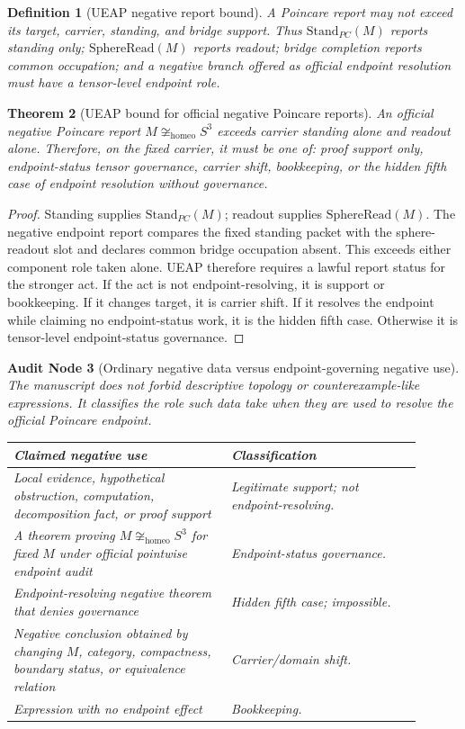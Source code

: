 \documentclass[11pt]{article}
\newtheorem{theorem}{Theorem}[section]
\newtheorem{definition}[theorem]{Definition}
\newtheorem{audit}[theorem]{Audit Node}
\newcommand{\Sthree}{S^{3}}
\newcommand{\StandPC}{\mathrm{Stand}_{PC}}
\newcommand{\SphereRead}{\mathrm{SphereRead}}
\newcommand{\Homeo}{\cong_{\mathrm{homeo}}}
\begin{document}
\begin{definition}[UEAP negative report bound]
A Poincare report may not exceed its target, carrier, standing, and bridge support. Thus \(\StandPC(M)\) reports standing only; \(\SphereRead(M)\) reports readout; bridge completion reports common occupation; and a negative branch offered as official endpoint resolution must have a tensor-level endpoint role.
\end{definition}

\begin{theorem}[UEAP bound for official negative Poincare reports]\label{thm:ueap-negative-bound}
An official negative Poincare report \(M\not\Homeo\Sthree\) exceeds carrier standing alone and readout alone. Therefore, on the fixed carrier, it must be one of: proof support only, endpoint-status tensor governance, carrier shift, bookkeeping, or the hidden fifth case of endpoint resolution without governance.
\end{theorem}
\begin{proof}
Standing supplies \(\StandPC(M)\); readout supplies \(\SphereRead(M)\). The negative endpoint report compares the fixed standing packet with the sphere-readout slot and declares common bridge occupation absent. This exceeds either component role taken alone. UEAP therefore requires a lawful report status for the stronger act. If the act is not endpoint-resolving, it is support or bookkeeping. If it changes target, it is carrier shift. If it resolves the endpoint while claiming no endpoint-status work, it is the hidden fifth case. Otherwise it is tensor-level endpoint-status governance.
\end{proof}

\begin{audit}[Ordinary negative data versus endpoint-governing negative use]
The manuscript does not forbid descriptive topology or counterexample-like expressions. It classifies the role such data take when they are used to resolve the official Poincare endpoint.
\begin{longtable}{L{0.48\linewidth}L{0.42\linewidth}}
\toprule
\textbf{Claimed negative use} & \textbf{Classification}\\
\midrule
Local evidence, hypothetical obstruction, computation, decomposition fact, or proof support & Legitimate support; not endpoint-resolving.\\
A theorem proving \(M\not\Homeo\Sthree\) for fixed \(M\) under official pointwise endpoint audit & Endpoint-status governance.\\
Endpoint-resolving negative theorem that denies governance & Hidden fifth case; impossible.\\
Negative conclusion obtained by changing \(M\), category, compactness, boundary status, or equivalence relation & Carrier/domain shift.\\
Expression with no endpoint effect & Bookkeeping.\\
\bottomrule
\end{longtable}
\end{audit}
\end{document}

